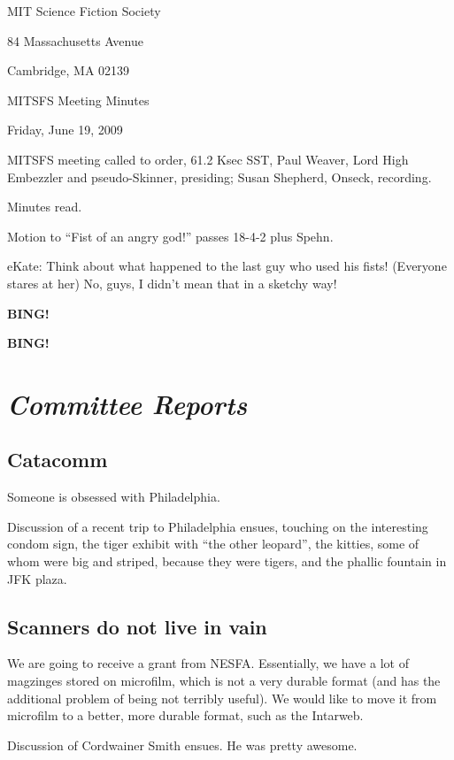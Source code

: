 \documentclass[10pt]{article}
\newcommand{\bing}{{\bf BING!} }
\newcommand{\goto}[1]{\bing \vskip 12pt \section*{{\em{#1}}}}
\newcommand{\ps}{ plus Spehn\xspace}
\begin{document}
\begin{center}

MIT Science Fiction Society

84 Massachusetts Avenue

Cambridge, MA 02139

\vspace{12pt}

MITSFS Meeting Minutes

Friday, June 19, 2009

\end{center}

\vspace{18pt}

\setlength{\parskip}{6pt}

\noindent
MITSFS meeting called to order, 61.2 Ksec SST,
Paul Weaver, Lord High Embezzler and pseudo-Skinner, presiding; Susan Shepherd, Onseck, recording.

Minutes read.

Motion to ``Fist of an angry god!'' passes 18-4-2\ps.

eKate: Think about what happened to the last guy who used his fists! (Everyone stares at her) No, guys, I didn't mean that in a sketchy way!

\bing

\goto{Committee Reports}

\subsection*{Catacomm}
Someone is obsessed with Philadelphia.

Discussion of a recent trip to Philadelphia ensues, touching on the interesting condom sign, the tiger exhibit with ``the other leopard'', the kitties, some of whom were big and striped, because they were tigers, and the phallic fountain in JFK plaza.

\subsection*{Scanners do not live in vain}
We are going to receive a grant from NESFA. Essentially, we have a lot of magzinges stored on microfilm, which is not a very durable format (and has the additional problem of being not terribly useful). We would like to move it from microfilm to a better, more durable format, such as the Intarweb.

Discussion of Cordwainer Smith ensues. He was pretty awesome.
\end{document}

